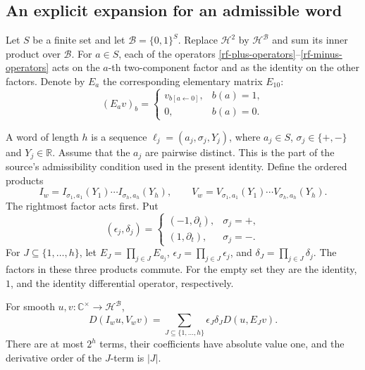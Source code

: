 \subsection{An explicit expansion for an admissible word}

Let $S$ be a finite set and let
$\mathcal B=\{0,1\}^S$.  Replace $\mathcal H^2$ by
$\mathcal H^{\mathcal B}$ and sum its inner product over
$\mathcal B$.  For $a\in S$, each of the operators
\eqref{rf-plus-operators}--\eqref{rf-minus-operators} acts
on the $a$-th two-component factor and as the identity
on the other factors.  Denote by $E_a$ the corresponding
elementary matrix $E_{10}$:
\[
 (E_a v)_b=
 \begin{cases}
 v_{b[a\leftarrow0]},& b(a)=1,\\
 0,&b(a)=0.
 \end{cases}
\]

A word of length $h$ is a sequence
$\ell_j=(a_j,\sigma_j,Y_j)$, where
$a_j\in S$, $\sigma_j\in\{+,-\}$ and $Y_j\in\mathbb R$.
Assume that the $a_j$ are pairwise distinct.
This is the part of the source's admissibility condition
used in the present identity.  Define the ordered products
\[
 I_w=I_{\sigma_1,a_1}(Y_1)\cdots I_{\sigma_h,a_h}(Y_h),
 \qquad
 V_w=V_{\sigma_1,a_1}(Y_1)\cdots V_{\sigma_h,a_h}(Y_h).
\]
The rightmost factor acts first.  Put
\[
 (\epsilon_j,\delta_j)=
 \begin{cases}
 (-1,\partial_{\overline t}),&\sigma_j=+,\\
 (1,\partial_t),&\sigma_j=-.
 \end{cases}
\]
For $J\subseteq\{1,\ldots,h\}$, let
$E_J=\prod_{j\in J}E_{a_j}$,
$\epsilon_J=\prod_{j\in J}\epsilon_j$, and
$\delta_J=\prod_{j\in J}\delta_j$.
The factors in these three products commute.
For the empty set they are the identity, $1$, and the
identity differential operator, respectively.

\begin{proposition}\label{rf-subset-expansion}
For smooth $u,v:\mathbb C^\times\to\mathcal H^{\mathcal B}$,
\begin{equation}\label{rf-explicit-expansion}
             D(I_wu,V_wv)
       =\sum_{J\subseteq\{1,\ldots,h\}}
                         \epsilon_J\delta_JD(u,E_Jv).
\end{equation}
There are at most $2^h$ terms, their coefficients have
absolute value one, and the derivative order of the
$J$-term is $|J|$.
\end{proposition}

